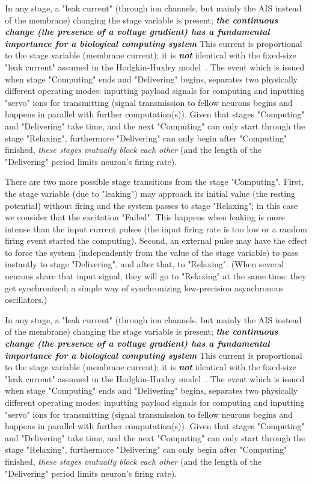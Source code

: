 In any stage, a "leak current" (through ion channels, but mainly the \gls{AIS}
instead of the membrane)
changing the stage variable is present; \textbf{\textit{the continuous change (the presence of a voltage gradient) has a fundamental importance for a biological computing system}}
This current is proportional to the stage variable (membrane current); it is \textbf{\textit{not}} identical with the fixed-size "leak current" assumed in the Hodgkin-Huxley model~\cite{HodgkinHuxley:1952}.
The event which is issued when stage "Computing" ends and "Delivering" begins, separates two physically different operating modes: inputting payload signals for computing
and inputting "servo" ions for transmitting
(signal transmission to fellow neurons begins and happens in parallel
with further computation(s)).
Given that stages "Computing" and "Delivering" take time,
and the next "Computing" can only start through the stage "Relaxing",   
furthermore "Delivering" can only begin after "Computing" finished,
\textit{these stages mutually block each other} (and the length of the "Delivering" period limits neuron's firing rate). 

There are two more possible stage transitions from the stage "Computing".
First, the stage variable (due to "leaking") may approach its initial value (the resting potential) without firing and the system passes to stage "Relaxing"; in this case we consider that the excitation "Failed".
This happens when leaking is more intense than the input current pulses (the input firing rate is too low or a random firing event started the computing).
Second, an external pulse may have the effect to force the system (independently from the value of the stage variable) to pass instantly to stage "Delivering", and after that, to "Relaxing". (When several neurons share that input signal,
they will go to "Relaxing" at the same time: they get synchronized; a simple way of synchronizing low-precision asynchronous oscillators.)


\else

In any stage, a "leak current" (through ion channels, but mainly the \gls{AIS}
instead of the membrane)
changing the stage variable is present; \textbf{\textit{the continuous change (the presence of a voltage gradient) has a fundamental importance for a biological computing system}}
This current is proportional to the stage variable (membrane current); it is \textbf{\textit{not}} identical with the fixed-size "leak current" assumed in the Hodgkin-Huxley model~\cite{HodgkinHuxley:1952}.
The event which is issued when stage "Computing" ends and "Delivering" begins, separates two physically different operating modes: inputting payload signals for computing
and inputting "servo" ions for transmitting
(signal transmission to fellow neurons begins and happens in parallel
with further computation(s)).
Given that stages "Computing" and "Delivering" take time,
and the next "Computing" can only start through the stage "Relaxing",   
furthermore "Delivering" can only begin after "Computing" finished,
\textit{these stages mutually block each other} (and the length of the "Delivering" period limits neuron's firing rate). 

